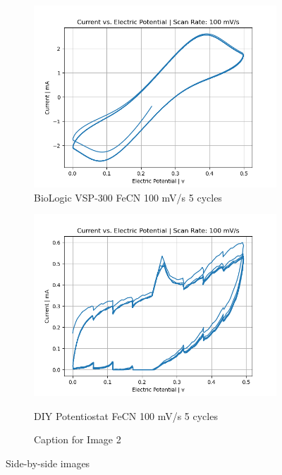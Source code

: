 \documentclass{article}
\begin{document}
\begin{figure}[H]
  \centering
  \begin{subfigure}[b]{0.45\textwidth}
    \includegraphics[width=\textwidth]{FECN_100mVs_5cycles_lab.png}
    \caption{BioLogic VSP-300 FeCN 100 mV/s 5 cycles}
  \end{subfigure}
  \hfill
  \begin{subfigure}[b]{0.45\textwidth}
    \includegraphics[width=\textwidth]{FECN_100mVs_5cycles.png}
    \caption{DIY Potentiostat FeCN 100 mV/s 5 cycles}
    \caption{Caption for Image 2}
  \end{subfigure}
  \caption{Side-by-side images}
\end{figure}
\end{document}

